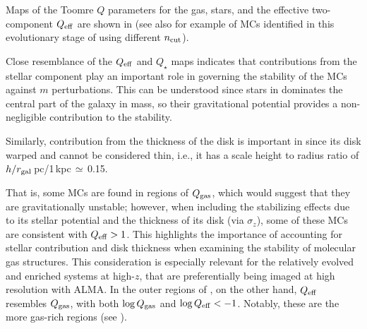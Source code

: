 \IfFileExists{emulateapjlegacy.cls}{\documentclass[iop]{emulateapjlegacy}}{\documentclass[iop]{emulateapj}}
\begin{document}
Maps of the Toomre $Q$ parameters for the gas, stars, and the effective two-component $Q_{\rm eff}$ are shown in 
(see also  for example of MCs identified in this evolutionary stage of \flower
using different $n_{\rm cut}$). 

Close resemblance of the $Q_{\rm eff}$ and $Q_{\star}$ maps indicates that contributions from the stellar component play an important role in governing the stability of the MCs against $m$ perturbations. This can be understood since stars in \flower dominates the central part of the galaxy in mass, so their gravitational potential provides a non-negligible contribution to the stability.

Similarly, contribution from the thickness of the disk is important in \flower since its disk warped and cannot be considered thin, i.e., 
it has a scale height to radius ratio of $h/r_{\rm gal}$\,pc/1\,kpc\,$\simeq$\,0.15.

That is, some MCs are found in regions of $Q_{\rm gas}$, 
which would suggest that they are gravitationally unstable;
however, when including the stabilizing effects due to its stellar potential and the
thickness of its disk (via $\sigma_z$), some of these MCs are consistent with $Q_{\rm eff} > 1$.
This highlights the importance of accounting for stellar contribution and disk thickness 
when examining the stability of molecular gas structures.
This consideration is especially relevant for the relatively evolved and enriched systems at high-$z$, 
that are preferentially being imaged at high resolution with ALMA.
In the outer regions of \flower, on the other hand, $Q_{\rm eff}$ resembles $Q_{\rm gas}$, with 
both $\log{Q_{\rm gas}}$ and $\log{Q_{\rm eff}} < -1$. 
Notably, these are the more gas-rich regions (see ).
\end{document}
